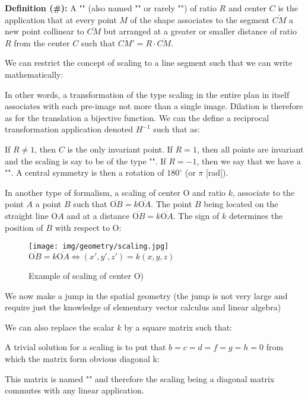 	\textbf{Definition (\#\mydef):} A "" (also named "" or rarely "") of ratio $R$ and center $C$ is the application that at every point $M$ of the shape associates to the segment $\overline{CM}$ a new point collinear to $\overline{CM}$ but arranged at a greater or smaller distance of ratio $R$ from the center $C$ such that $\overline{CM'}=R\cdot \overline{CM}$.

	We can restrict the concept of scaling to a line segment such that we can write mathematically:
	
	In other words, a transformation of the type scaling in the entire plan in itself associates with each pre-image not more than a single image. Dilation is therefore as for the translation a bijective function. We can the define a reciprocal transformation application denoted $H^{-1}$ such that as:
	
	If $R\neq 1$, then $C$ is the only invariant point. If $R=1$, then all points are invariant and the scaling is say to be of the type "". If $R=-1$, then we say that we have a "". A central symmetry is then a rotation of $180^\circ$ (or $\pi$ [rad]).
	
	In another type of formalism, a scaling of center O and ratio $k$, associate to the point $A$ a point $B$ such that $\overline{\text{O}B}=k\overline{\text{O}A}$. The point $B$ being located on the straight line $\text{O}A$ and at a distance $\overline{\text{O}B}=k\overline{\text{O}A}$. The sign of $k$ determines the position of $B$ with respect to O:
	\begin{figure}[H]
		\centering
		\texttt{[image: img/geometry/scaling.jpg]}\\
		$\overline{\text{O}B}=k\overline{\text{O}A}\Leftrightarrow (x',y',z')=k(x,y,z)$
		\caption{Example of scaling of center O)}
	\end{figure}
	We now make a jump in the spatial geometry (the jump is not very large and require just the knowledge of elementary vector calculus and linear algebra)

	We can also replace the scalar $k$ by a square matrix such that:
	
	A trivial solution for a scaling is to put that $b=c=d=f=g=h=0$ from which the matrix form obvious diagonal k:
	
	This matrix is named "" and therefore the scaling being a diagonal matrix commutes with any linear application.
	
